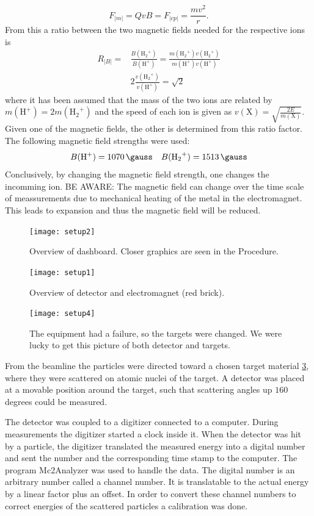 \begin{equation}
F_|m| = QvB = F_|cp| = \frac{mv^2}{r}.
\end{equation}
From this a ratio between the two magnetic fields needed for the respective
ions is
\begin{align}
    R_|B| = & \frac{B({\mathrm{H_2}^+})}{B(\mathrm{H^+})} =
    \frac{m({\mathrm{H_2}^+})
    v({\mathrm{H_2}^+})}{m(\mathrm{H^+})v(\mathrm{H^+})}\\
    & 2 \frac{v({\mathrm{H_2}^+})}{v(\mathrm{H^+})} = \sqrt{2}
\end{align}
%
where it has been assumed that the mass of the two ions are related by
$m(\mathrm{H^+}) = 2m(\mathrm{{H_2}^+})$ and the speed of each ion is given as
$v(\mathrm{X}) = \sqrt{\frac{2E}{m(\mathrm{X})}}$.
%
Given one of the magnetic fields, the other is determined from this ratio
factor. The following magnetic field strengths were used:
%
\begin{equation}
    B(\mathrm{H^+}) = \SI{1070}{\gauss} \quad B(\mathrm{{H_2}^+}) = \SI{1513}{\gauss}
\end{equation}
%
Conclusively, by changing the magnetic field strength, one changes the
incomming ion. BE AWARE: The magnetic field can change over the time scale of meassurements
due to mechanical heating of the metal in the electromagnet. This leads to expansion and thus
the magnetic field will be reduced.
%
\begin{figure}[t]
    \centering
    \texttt{[image: setup2]}
    \caption{Overview of dashboard. Closer graphics are seen in the Procedure.}
    \label{fig_setup2}
\end{figure}
%
\begin{figure}[t]
    \centering
    \texttt{[image: setup1]}
    \caption{Overview of detector and electromagnet (red brick).}
    \label{fig_setup1}
\end{figure}
%
\begin{figure}[t]
    \centering
    \texttt{[image: setup4]}
    \caption{The equipment had a failure, so the targets were changed. We were
    lucky to get this picture of both detector and targets.}
    \label{fig_setup4}
\end{figure}
%
From the beamline the particles were directed toward a chosen target material
\cref{fig_setup4}, where they were scattered on atomic nuclei of the
target. A detector was placed at a movable position around the target, such
that scattering angles up $160$ degrees could be measured.

The detector was coupled to a digitizer connected to a computer. During
measurements the digitizer started a clock inside it. When the detector was hit
by a particle, the digitizer translated the measured energy into a digital
number and sent the number and the corresponding time stamp to the computer.
The program Mc2Analyzer was used to handle the data. The digital number is an
arbitrary number called a channel number. It is translatable to the actual
energy by a linear factor plus an offset. In order to convert these channel
numbers to correct energies of the scattered particles a calibration was done.

